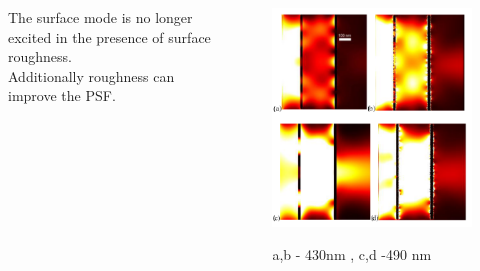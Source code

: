 \documentclass{beamer}
\begin{document}
\begin{frame}
	\begin{columns}
		\begin{column}{0.5\textwidth}
				The surface mode is no longer excited in the presence of surface roughness.\\
				Additionally roughness can improve the PSF.

		\end{column}
		\begin{column}{0.5\textwidth}
			\begin{figure}
				\includegraphics[width=\textwidth]{../images/multilayer/plp-chropo.png}\\
				\caption{ a,b - 430nm , c,d -490 nm}
			\end{figure}
		\end{column}
	\end{columns}
		
\end{frame}
\end{document}
